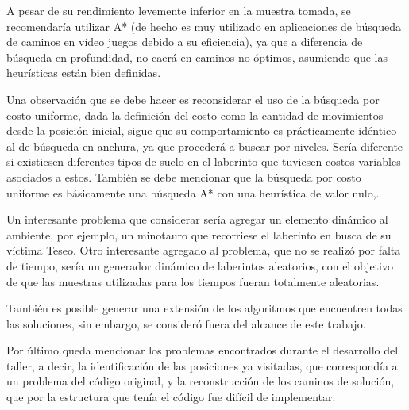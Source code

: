 \documentclass[letter, titlepage, 10pt]{article}
\begin{document}
A pesar de su rendimiento levemente inferior en la muestra tomada, se recomendaría utilizar A* (de hecho es muy utilizado en aplicaciones de búsqueda de caminos en vídeo juegos debido a su eficiencia), ya que a diferencia de búsqueda en profundidad, no caerá en caminos no óptimos, asumiendo que las heurísticas están bien definidas. 

Una observación que se debe hacer es reconsiderar el uso de la búsqueda por costo uniforme, dada la definición del costo como la cantidad de movimientos desde la posición inicial, sigue que su comportamiento es prácticamente idéntico al de búsqueda en anchura, ya que procederá a buscar por niveles. Sería diferente si existiesen diferentes tipos de suelo en el laberinto que tuviesen costos variables asociados a estos. También se debe mencionar que la búsqueda por costo uniforme es básicamente una búsqueda A* con una heurística de valor nulo,.

Un interesante problema que considerar sería agregar un elemento dinámico al ambiente, por ejemplo, un minotauro que recorriese el laberinto en busca de su víctima Teseo. Otro interesante agregado al problema, que no se realizó por falta de tiempo, sería un generador dinámico de laberintos aleatorios, con el objetivo de que las muestras utilizadas para los tiempos fueran totalmente aleatorias.

También es posible generar una extensión de los algoritmos que encuentren todas las soluciones, sin embargo, se consideró fuera del alcance de este trabajo. 

Por último queda mencionar los problemas encontrados durante el desarrollo del taller, a decir, la identificación de las posiciones ya visitadas, que correspondía a un problema del código original, y la reconstrucción de los caminos de solución, que por la estructura que tenía el código fue difícil de implementar.


\newpage


\end{document}

